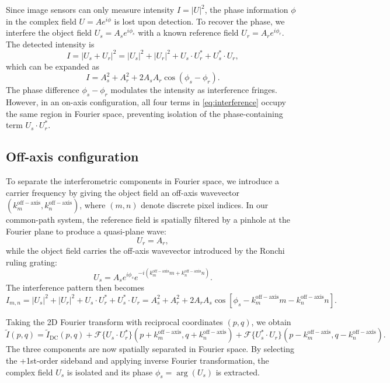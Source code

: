 Since image sensors can only measure intensity $I = |U|^2$, the phase information $\phi$ in the complex field $U = A e^{i\phi}$ is lost upon detection. To recover the phase, we interfere the object field $U_s = A_s e^{i\phi_s}$ with a known reference field $U_r = A_r e^{i\phi_r}$. The detected intensity is
\begin{equation}
\label{eq:interference}
I = |U_s + U_r|^2 = |U_s|^2 + |U_r|^2 + U_s \cdot U_r^* + U_s^* \cdot U_r,
\end{equation}
which can be expanded as
\begin{equation}
I = A_s^2 + A_r^2 + 2A_s A_r \cos(\phi_s - \phi_r).
\end{equation}
The phase difference $\phi_s - \phi_r$ modulates the intensity as interference fringes. However, in an on-axis configuration, all four terms in \eqref{eq:interference} occupy the same region in Fourier space, preventing isolation of the phase-containing term $U_s \cdot U_r^*$.

\subsection{Off-axis configuration}

To separate the interferometric components in Fourier space, we introduce a carrier frequency by giving the object field an off-axis wavevector $(k_m^{\mathrm{off-axis}}, k_n^{\mathrm{off-axis}})$, where $(m, n)$ denote discrete pixel indices. In our common-path system, the reference field is spatially filtered by a pinhole at the Fourier plane to produce a quasi-plane wave:
\begin{equation}
U_r = A_r,
\end{equation}
while the object field carries the off-axis wavevector introduced by the Ronchi ruling grating:
\begin{equation}
U_s = A_s e^{i\phi_s} e^{-i(k_m^{\mathrm{off-axis}} m + k_n^{\mathrm{off-axis}} n)}.
\end{equation}
The interference pattern then becomes
\begin{equation}
I_{m,n} = |U_s|^2 + |U_r|^2 + U_s \cdot U_r^* + U_s^* \cdot U_r = A_s^2 + A_r^2 + 2A_r A_s \cos[\phi_s - k_m^{\mathrm{off-axis}} m - k_n^{\mathrm{off-axis}} n].
\end{equation}

Taking the 2D Fourier transform with reciprocal coordinates $(p,q)$, we obtain
\begin{equation}
\tilde{I}(p,q) = \tilde{I}_{\mathrm{DC}}(p,q) + \mathcal{F}\{U_s \cdot U_r^*\}(p + k_m^{\mathrm{off-axis}}, q + k_n^{\mathrm{off-axis}}) + \mathcal{F}\{U_s^* \cdot U_r\}(p - k_m^{\mathrm{off-axis}}, q - k_n^{\mathrm{off-axis}}).
\end{equation}
The three components are now spatially separated in Fourier space. By selecting the +1st-order sideband and applying inverse Fourier transformation, the complex field $U_s$ is isolated and its phase $\phi_s = \arg(U_s)$ is extracted.

